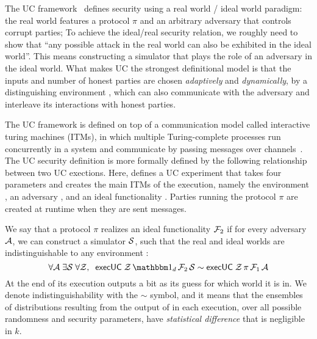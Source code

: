 The UC framework~\cite{canettiUC} defines security using
a real world / ideal world paradigm:
the real world features a protocol $\pi$ and an arbitrary adversary \A that controls corrupt parties;
To achieve the ideal/real security relation, we roughly need to show that ``any possible attack in the real world can also be exhibited
in the ideal world''.
This means constructing a simulator \Sim that plays the role of an adversary in the ideal world.
What makes UC the strongest definitional model is that the inputs and number of honest parties are chosen \emph{adaptively}
and \emph{dynamically}, by a distinguishing environment \Z, which can also communicate with the adversary and interleave its interactions with honest parties.

The UC framework is defined on top of a communication model called interactive turing machines (ITMs), in which multiple Turing-complete processes run concurrently in a system and communicate by passing messages over channels~\cite{canettiUC}.
The UC security definition is more formally defined by the following relationship between two UC exections. 
Here,  defines a UC experiment that takes four parameters and creates the main ITMs of the execution, namely the environment \Z, an adversary \A, and an ideal functionality \F.  
Parties running the protocol $\pi$ are created at runtime when they are sent messages. 

We say that a protocol $\pi$ realizes an ideal functionality $\mathcal{F}_2$
if for every adversary $\mathcal{A}$, we can construct a simulator $\mathcal{S}$, such that the real and ideal worlds are indistinguishable to any environment \Z:
\begin{equation}
  \label{eqn:emulation}
  \forall \A \; \exists \Sim \; \forall \Z, \; \; \msf{execUC} \; \Z \, \idealP \, \F_2 \, \Sim \sim \msf{execUC} \; \Z \, \pi \, \F_1 \, \A
\end{equation}
At the end of its execution \Z outputs a bit as its guess for which world it is in.
We denote indistinguishability with the $\sim$ symbol, and it means that the ensembles of distributions resulting from the output of \Z in each execution, over all possible randomness and security parameters, have \emph{statistical difference} that is negligible in $k$. 

